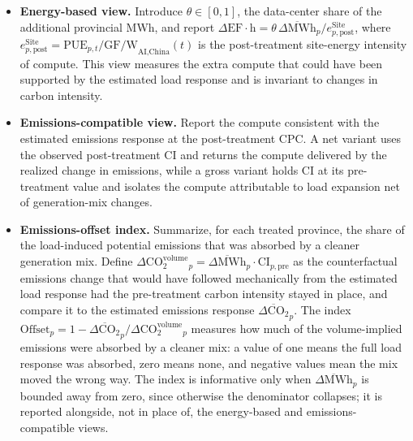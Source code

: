 \documentclass[12pt,a4paper]{article}
\begin{document}
\begin{itemize}
  \item \textbf{Energy-based view.} Introduce $\theta \in [0,1]$, the
        data-center share of the additional provincial MWh, and
        report
        $\Delta\text{EF}\cdot\text{h} = \theta \,
        \overline{\Delta\text{MWh}}_{p} / e^{\text{Site}}_{p,\text{post}}$,
        where $e^{\text{Site}}_{p,\text{post}} = \text{PUE}_{p,t} /
        \text{GF/W}_{\text{AI,China}}(t)$ is the post-treatment
        site-energy intensity of compute. This view measures the
        extra compute that could have been supported by the
        estimated load response and is invariant to changes in
        carbon intensity.

  \item \textbf{Emissions-compatible view.} Report the compute
        consistent with the estimated emissions response at the
        post-treatment CPC. A net variant uses the observed
        post-treatment CI and returns the compute delivered by the
        realized change in emissions, while a gross variant holds CI
        at its pre-treatment value and isolates the compute
        attributable to load expansion net of generation-mix changes.

  \item \textbf{Emissions-offset index.} Summarize, for each
        treated province, the share of the load-induced potential
        emissions that was absorbed by a cleaner generation mix.
        Define $\Delta\text{CO}_2^{\text{volume}}_{p} =
        \overline{\Delta\text{MWh}}_{p} \cdot \text{CI}_{p,\text{pre}}$
        as the counterfactual emissions change that would have
        followed mechanically from the estimated load response had
        the pre-treatment carbon intensity stayed in place, and
        compare it to the estimated emissions response
        $\overline{\Delta\text{CO}_2}_{p}$. The index
        $\text{Offset}_{p} = 1 -
        \overline{\Delta\text{CO}_2}_{p} / \Delta\text{CO}_2^{\text{volume}}_{p}$
        measures how much of the volume-implied emissions were
        absorbed by a cleaner mix: a value of one means the full
        load response was absorbed, zero means none, and negative
        values mean the mix moved the wrong way. The index is
        informative only when $\overline{\Delta\text{MWh}}_{p}$ is
        bounded away from zero, since otherwise the denominator
        collapses; it is reported alongside, not in place of, the
        energy-based and emissions-compatible views.
\end{itemize}
\end{document}
